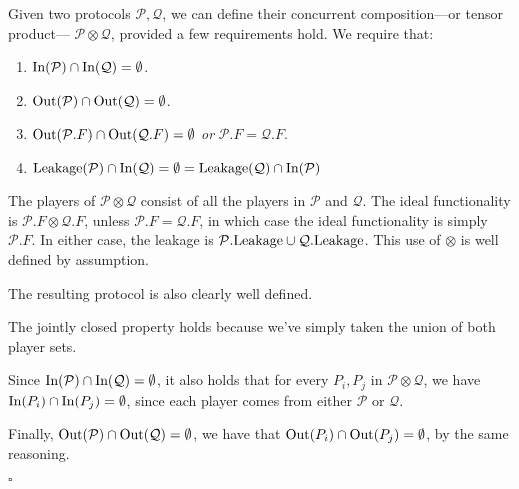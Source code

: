 \begin{definition}
Given two protocols $\mathcal{P}, \mathcal{Q}$,
we can define their concurrent composition---or tensor product---
$\mathcal{P} \otimes \mathcal{Q}$, provided a few requirements hold.
We require that:
\begin{enumerate}
\item $\text{In}(\mathcal{P}) \cap \text{In}(\mathcal{Q}) = \emptyset$.
\item $\text{Out}(\mathcal{P}) \cap \text{Out}(\mathcal{Q}) = \emptyset$.
\item $\text{Out}(\mathcal{P}.F) \cap \text{Out}(\mathcal{Q}.F) = \emptyset$ \emph{or} $\mathcal{P}.F = \mathcal{Q}.F$.
\item $\text{Leakage}(\mathcal{P}) \cap \text{In}(\mathcal{Q}) = \emptyset = \text{Leakage}(\mathcal{Q}) \cap \text{In}(\mathcal{P})$
\end{enumerate}

The players of $\mathcal{P} \otimes \mathcal{Q}$ consist of all the players
in $\mathcal{P}$ and $\mathcal{Q}$.
The ideal functionality is $\mathcal{P}.F \otimes \mathcal{Q}.F$, 
unless $\mathcal{P}.F = \mathcal{Q}.F$, in which case the ideal functionality
is simply $\mathcal{P}.F$.
In either case, the leakage is $\mathcal{P}.\text{Leakage} \cup \mathcal{Q}.\text{Leakage}$.
This use of $\otimes$ is well defined by assumption.

The resulting protocol is also clearly well defined.

The jointly closed property holds because we've simply taken the union
of both player sets.

Since $\text{In}(\mathcal{P}) \cap \text{In}(\mathcal{Q}) = \emptyset$,
it also holds that for every $P_i, P_j$ in $\mathcal{P} \otimes \mathcal{Q}$,
we have $\text{In}(P_i) \cap \text{In}(P_j) = \emptyset$,
since each player comes from either $\mathcal{P}$ or $\mathcal{Q}$.
      
Finally, $\text{Out}(\mathcal{P}) \cap \text{Out}(\mathcal{Q}) = \emptyset$,
we have that $\text{Out}(P_i) \cap \text{Out}(P_j) = \emptyset$,
by the same reasoning.
    
$\square$
\end{definition}


